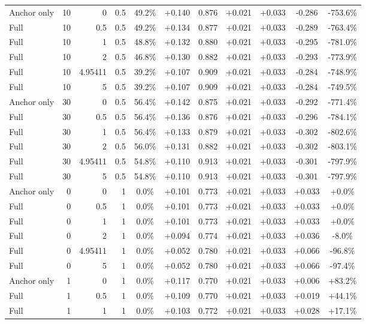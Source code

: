 \begin{table}[htbp]
\begin{tabular}{lrrrccccccc}
Anchor only & 10 & 0 & 0.5 & 49.2\% & +0.140 & 0.876 & +0.021 & +0.033 & -0.286 & -753.6\% \\
Full & 10 & 0.5 & 0.5 & 49.2\% & +0.134 & 0.877 & +0.021 & +0.033 & -0.289 & -763.4\% \\
Full & 10 & 1 & 0.5 & 48.8\% & +0.132 & 0.880 & +0.021 & +0.033 & -0.295 & -781.0\% \\
Full & 10 & 2 & 0.5 & 46.8\% & +0.130 & 0.882 & +0.021 & +0.033 & -0.293 & -773.9\% \\
Full & 10 & 4.95411 & 0.5 & 39.2\% & +0.107 & 0.909 & +0.021 & +0.033 & -0.284 & -748.9\% \\
Full & 10 & 5 & 0.5 & 39.2\% & +0.107 & 0.909 & +0.021 & +0.033 & -0.284 & -749.5\% \\
Anchor only & 30 & 0 & 0.5 & 56.4\% & +0.142 & 0.875 & +0.021 & +0.033 & -0.292 & -771.4\% \\
Full & 30 & 0.5 & 0.5 & 56.4\% & +0.136 & 0.876 & +0.021 & +0.033 & -0.296 & -784.1\% \\
Full & 30 & 1 & 0.5 & 56.4\% & +0.133 & 0.879 & +0.021 & +0.033 & -0.302 & -802.6\% \\
Full & 30 & 2 & 0.5 & 56.0\% & +0.131 & 0.882 & +0.021 & +0.033 & -0.302 & -803.1\% \\
Full & 30 & 4.95411 & 0.5 & 54.8\% & +0.110 & 0.913 & +0.021 & +0.033 & -0.301 & -797.9\% \\
Full & 30 & 5 & 0.5 & 54.8\% & +0.110 & 0.913 & +0.021 & +0.033 & -0.301 & -797.9\% \\
Anchor only & 0 & 0 & 1 & 0.0\% & +0.101 & 0.773 & +0.021 & +0.033 & +0.033 & +0.0\% \\
Full & 0 & 0.5 & 1 & 0.0\% & +0.101 & 0.773 & +0.021 & +0.033 & +0.033 & +0.0\% \\
Full & 0 & 1 & 1 & 0.0\% & +0.101 & 0.773 & +0.021 & +0.033 & +0.033 & +0.0\% \\
Full & 0 & 2 & 1 & 0.0\% & +0.094 & 0.774 & +0.021 & +0.033 & +0.036 & -8.0\% \\
Full & 0 & 4.95411 & 1 & 0.0\% & +0.052 & 0.780 & +0.021 & +0.033 & +0.066 & -96.8\% \\
Full & 0 & 5 & 1 & 0.0\% & +0.052 & 0.780 & +0.021 & +0.033 & +0.066 & -97.4\% \\
Anchor only & 1 & 0 & 1 & 0.0\% & +0.117 & 0.770 & +0.021 & +0.033 & +0.006 & +83.2\% \\
Full & 1 & 0.5 & 1 & 0.0\% & +0.109 & 0.770 & +0.021 & +0.033 & +0.019 & +44.1\% \\
Full & 1 & 1 & 1 & 0.0\% & +0.103 & 0.772 & +0.021 & +0.033 & +0.028 & +17.1\% \\

\end{tabular}
\end{table}
